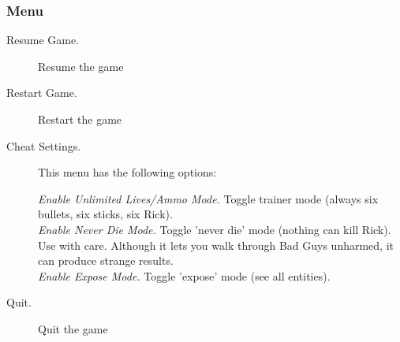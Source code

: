 \subsubsection{Menu}
\begin{description}
  \item[Resume Game. ] Resume the game
  \item[Restart Game. ] Restart the game
  \item[Cheat Settings. ] This menu has the following options:

  \emph{Enable Unlimited Lives/Ammo Mode. } Toggle trainer mode (always six bullets, six sticks, six Rick).\\
  \emph{Enable Never Die Mode. } Toggle 'never die' mode (nothing can kill Rick). Use with care.
        Although it lets you walk through Bad Guys unharmed, it can produce strange results.\\
  \emph{Enable Expose Mode. } Toggle 'expose' mode (see all entities).%

  \item[Quit. ] Quit the game
\end{description}
